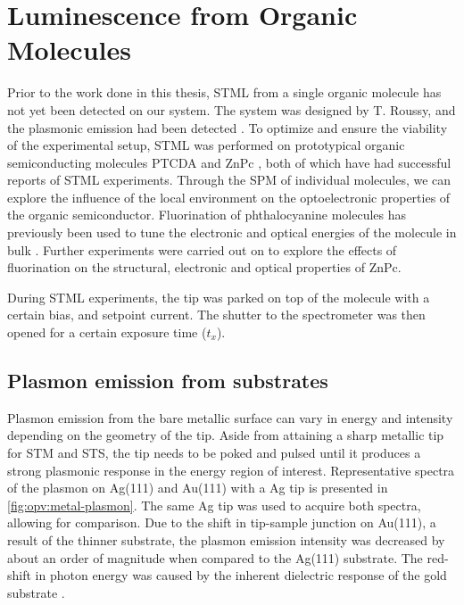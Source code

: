 
\chapter{Luminescence from Organic Molecules}
\label{ch:opv}

Prior to the work done in this thesis, \ac{STML} from a single organic molecule has not yet been detected on our system. The system was designed by T. Roussy, and the plasmonic emission had been detected \citep{roussy2016coupling}. To optimize and ensure the viability of the experimental setup, \ac{STML} was performed on prototypical organic semiconducting molecules \ac{PTCDA} \citep{Rzeznicka2011, Kimura2019} and \ac{ZnPc} \citep{Zhang2016, Doppagne2017, Zhang2017, Imada2016, Doppagne2018, Miwa2019}, both of which have had successful reports of \ac{STML} experiments. Through the \ac{SPM} of individual molecules, we can explore the influence of the local environment on the optoelectronic properties of the organic semiconductor. Fluorination of phthalocyanine molecules has previously been used to tune the electronic and optical energies of the molecule in bulk \citep{schwarze2016band, warren2019controlling}. Further experiments were carried out on  to explore the effects of fluorination on the structural, electronic and optical properties of ZnPc. 

During \ac{STML} experiments, the tip was parked on top of the molecule with a certain bias, and setpoint current. The shutter to the spectrometer was then opened for a certain exposure time ($t_x$).

\section{Plasmon emission from substrates}

Plasmon emission from the bare metallic surface can vary in energy and intensity depending on the geometry of the tip. Aside from attaining a sharp metallic tip for \ac{STM} and \ac{STS}, the tip needs to be poked and pulsed until it produces a strong plasmonic response in the energy region of interest. Representative spectra of the plasmon on Ag(111) and Au(111) with a Ag tip is presented in \autoref{fig:opv:metal-plasmon}. The same Ag tip was used to acquire both spectra, allowing for comparison. Due to the shift in tip-sample junction on Au(111), a result of the thinner substrate, the plasmon emission intensity was decreased by about an order of magnitude when compared to the Ag(111) substrate. The red-shift in photon energy was caused by the inherent dielectric response of the gold substrate \citep{olmon2012optical, yang2015optical}. 

